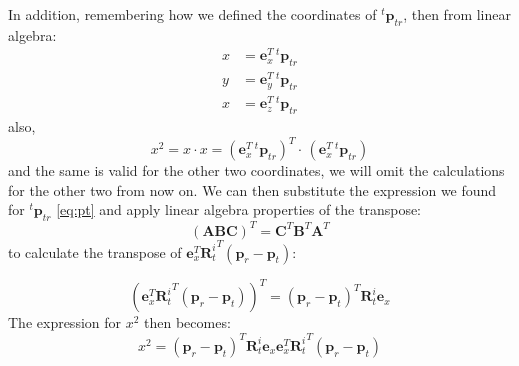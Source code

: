 In addition, remembering how we defined the coordinates of ${}^t \mathbf{p}_{tr}$, then from linear algebra:
\[
\begin{aligned}
x &= \mathbf{e}_x^T \, {}^t \mathbf{p}_{tr} \\
y &= \mathbf{e}_y^T \, {}^t \mathbf{p}_{tr} \\
x  &= \mathbf{e}_z^T  \, {}^t \mathbf{p}_{tr}
\end{aligned}
\]
also,
\[
x^2 = x \cdot x = \left( \mathbf{e}_x^T \, {}^t \mathbf{p}_{tr} \right)^T \cdot \, \left( \mathbf{e}_x^T \, {}^t \mathbf{p}_{tr} \right)
\]
and the same is valid for the other two coordinates, we will omit the calculations for the other two from now on. 
We can then substitute the expression we found for ${}^t \mathbf{p}_{tr}$ \ref{eq:pt} and apply linear algebra properties of the transpose:
$$(\mathbf{A}\mathbf{B}\mathbf{C})^T = \mathbf{C}^T \mathbf{B}^T \mathbf{A}^T$$ to calculate the transpose of $\mathbf{e}_x^T {\mathbf{R}_t^i}^T (\mathbf{p}_r - \mathbf{p}_t)$:

\[
(\mathbf{e}_x^T {\mathbf{R}_t^i}^T (\mathbf{p}_r - \mathbf{p}_t))^T = (\mathbf{p}_r - \mathbf{p}_t)^T {\mathbf{R}_t^i} \mathbf{e}_x
\]
The expression for $x^2$ then becomes:
\begin{equation}
    x^2 = \left(\mathbf{p}_r - \mathbf{p}_t\right)^T {\mathbf{R}_t^i} \mathbf{e}_x \mathbf{e}_x^T {\mathbf{R}_t^i}^T \left(\mathbf{p}_r - \mathbf{p}_t\right)
    \label{eq:x2}
\end{equation}

